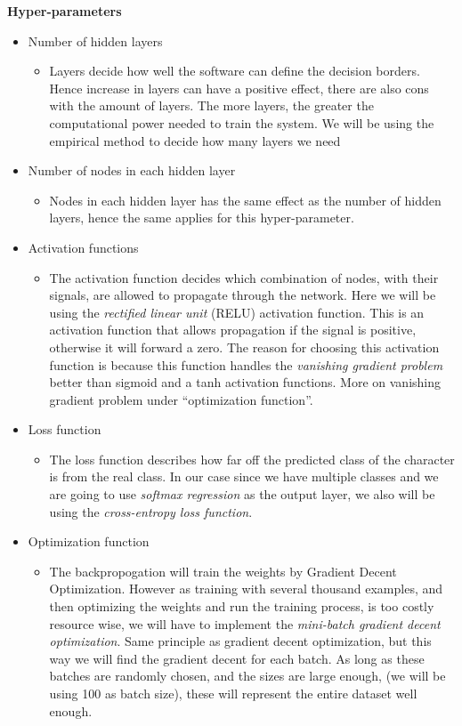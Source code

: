 \documentclass[Report.tex]{subfiles}
\begin{document}
\begin{flushleft}
  \textbf{Hyper-parameters}
  \begin{itemize}
   \item{Number of hidden layers}
   \begin{itemize}
    \item{Layers decide how well the software can define the decision borders. Hence increase in layers can have a positive effect, there are also cons with the amount of layers. The more layers, the greater the computational power needed to train the system. We will be using the empirical method to decide how many layers we need}
   \end{itemize}
   \item{Number of nodes in each hidden layer}
   \begin{itemize}
    \item{Nodes in each hidden layer has the same effect as the number of hidden layers, hence the same applies for this hyper-parameter.}
   \end{itemize}
   \item{Activation functions}
   \begin{itemize}
    \item{The activation function decides which combination of nodes, with their signals, are allowed to propagate through the network. Here we will be using the \textit{rectified linear unit} (RELU) activation function. This is an activation function that allows propagation if the signal is positive, otherwise it will forward a zero. The reason for choosing this activation function is because this function handles the \textit{vanishing gradient problem} better than sigmoid and a tanh activation functions. More on vanishing gradient problem under ``optimization function''.}
   \end{itemize}
   \item{Loss function}
   \begin{itemize}
    \item{The loss function describes how far off the predicted class of the character is from the real class. In our case since we have multiple classes and we are going to use \textit{softmax regression} as the output layer, we also will be using the \textit{cross-entropy loss function}.}
   \end{itemize}
   \item{Optimization function}
   \begin{itemize}
    \item{The backpropogation will train the weights by Gradient Decent Optimization. However as training with several thousand examples, and then optimizing the weights and run the training process, is too costly resource wise, we will have to implement the \textit{mini-batch gradient decent optimization}. Same principle as gradient decent optimization, but this way we will find the gradient decent for each batch. As long as these batches are randomly chosen, and the sizes are large enough, (we will be using 100 as batch size), these will represent the entire dataset well enough.}

\end{itemize}
\end{itemize}
\end{flushleft}
\end{document}
